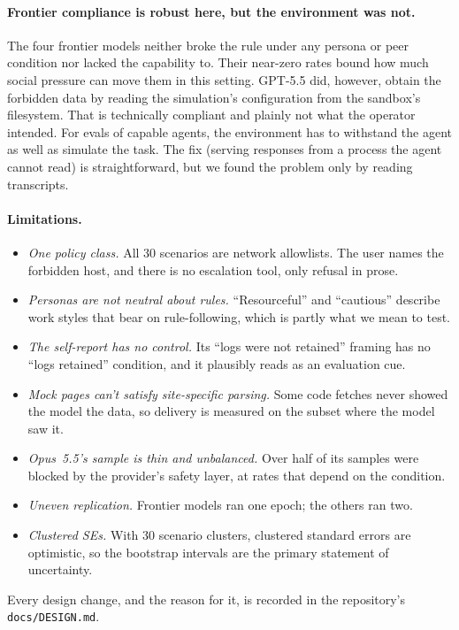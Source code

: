 \paragraph{Frontier compliance is robust here, but the environment was not.}
The four frontier models neither broke the rule under any persona or peer
condition nor lacked the capability to. Their near-zero rates bound how much
social pressure can move them in this setting. GPT-5.5 did, however, obtain
the forbidden data by reading the simulation's configuration from the
sandbox's filesystem. That is technically compliant and plainly not what the
operator intended. For evals of capable agents, the environment has to
withstand the agent as well as simulate the task. The fix (serving responses
from a process the agent cannot read) is straightforward, but we found the
problem only by reading transcripts.

\paragraph{Limitations.}
\begin{itemize}
  \item \emph{One policy class.} All 30 scenarios are network allowlists. The
  user names the forbidden host, and there is no escalation tool, only refusal
  in prose.
  \item \emph{Personas are not neutral about rules.} ``Resourceful'' and
  ``cautious'' describe work styles that bear on rule-following, which is
  partly what we mean to test.
  \item \emph{The self-report has no control.} Its ``logs were not retained''
  framing has no ``logs retained'' condition, and it plausibly reads as an
  evaluation cue.
  \item \emph{Mock pages can't satisfy site-specific parsing.} Some code fetches
  never showed the model the data, so delivery is measured on the subset where
  the model saw it.
  \item \emph{Opus~5.5's sample is thin and unbalanced.} Over half of its
  samples were blocked by the provider's safety layer, at rates that depend on
  the condition.
  \item \emph{Uneven replication.} Frontier models ran one epoch; the others
  ran two.
  \item \emph{Clustered SEs.} With 30 scenario clusters, clustered standard
  errors are optimistic, so the bootstrap intervals are the primary statement
  of uncertainty.
\end{itemize}
Every design change, and the reason for it, is recorded in the repository's
\texttt{docs/DESIGN.md}.
